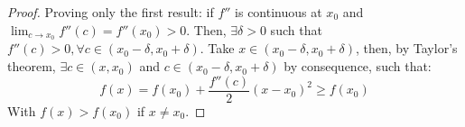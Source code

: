 \begin{proof}
    Proving only the first result: if $f''$ is continuous at $x_0$ and $\lim_{c \to x_0} f''(c) = f''(x_0) > 0$. Then, $\exists \delta > 0$ such that $f''(c) > 0, \forall c \in (x_0 - \delta, x_0 + \delta)$. Take $ x \in (x_0 - \delta, x_0 + \delta)$, then, by Taylor's theorem, $\exists c \in (x, x_0)$ and $c \in (x_0 - \delta, x_0 + \delta)$ by consequence, such that:
    \begin{equation*}
        f(x) = f(x_0) + \frac{f''(c)}{2}(x-x_0)^2 \geq f(x_0)
    \end{equation*}
    With $f(x) > f(x_0)$ if $x \neq x_0$.
\end{proof}